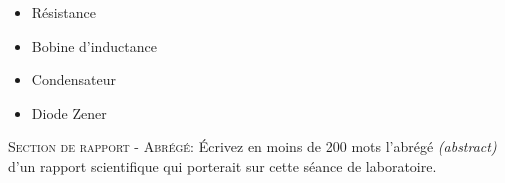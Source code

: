 \documentclass[canadien,12pt,oneside,letterpaper]{article}
\begin{document}
\begin{gradescope}
\begin{gradescope}
        \begin{itemize}[label=$\blacktriangleright$]
        \item Résistance
        \item Bobine d'inductance
        \item Condensateur
        \item Diode Zener
        \end{itemize}
    \end{gradescope}
    \item \textsc{Section de rapport - Abrégé:} Écrivez en moins de 200 mots l'abrégé \textit{(abstract)} d'un rapport scientifique qui porterait sur cette séance de laboratoire.
\end{gradescope}
\end{document}
